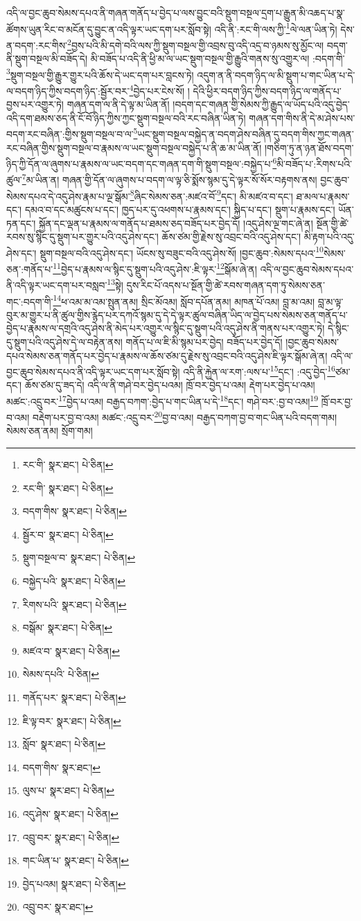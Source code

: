འདི་ལ་བྱང་ཆུབ་སེམས་དཔའ་ནི་གཞན་གནོད་པ་བྱེད་པ་ལས་བྱུང་བའི་སྡུག་བསྔལ་དྲག་པ་རྒྱུན་མི་འཆད་པ་སྣ་ཚོགས་ཡུན་རིང་བ་མངོན་དུ་བྱུང་ན་འདི་ལྟར་ཡང་དག་པར་སློབ་སྟེ། འདི་ནི་:རང་གི་ལས་ཀྱི་\footnote{རང་གི་  སྣར་ཐང་།  པེ་ཅིན། }ལེ་ལན་ཡིན་ཏེ། དེས་ན་བདག་:རང་གིས་\footnote{རང་གི་  སྣར་ཐང་།  པེ་ཅིན། }བྱས་པའི་མི་དགེ་བའི་ལས་ཀྱི་སྡུག་བསྔལ་གྱི་འབྲས་བུ་འདི་འདྲ་བ་ཉམས་སུ་མྱོང་ལ། བདག་ནི་སྡུག་བསྔལ་མི་བཟོད་དེ། མི་བཟོད་པ་འདི་ནི་ཕྱི་མ་ལ་ཡང་སྡུག་བསྔལ་གྱི་རྒྱུའི་གནས་སུ་འགྱུར་ལ། :བདག་གི་\footnote{བདག་གིས་  སྣར་ཐང་།  པེ་ཅིན། }སྡུག་བསྔལ་གྱི་རྒྱུར་གྱུར་པའི་ཆོས་དེ་ཡང་དག་པར་བླངས་ཏེ། འདུག་ན་ནི་བདག་ཉིད་ལ་མི་སྡུག་པ་གང་ཡིན་པ་དེ་ལ་བདག་ཉིད་ཀྱིས་བདག་ཉིད་:སྦྱོར་བར་\footnote{སྦྱོར་བ་  སྣར་ཐང་།  པེ་ཅིན། }བྱེད་པར་ངེས་སོ། །
དེའི་ཕྱིར་བདག་ཉིད་ཀྱིས་བདག་ཉིད་ལ་གནོད་པ་བྱས་པར་འགྱུར་ཏེ། གཞན་དག་ལ་ནི་དེ་ལྟ་མ་ཡིན་ནོ། །བདག་དང་གཞན་གྱི་སེམས་ཀྱི་རྒྱུད་ལ་ཡོད་པའི་འདུ་བྱེད་འདི་དག་ཐམས་ཅད་ནི་ངོ་བོ་ཉིད་ཀྱིས་ཀྱང་སྡུག་བསྔལ་བའི་རང་བཞིན་ཡིན་ཏེ། གཞན་དག་གིས་ནི་དེ་མ་ཤེས་པས་བདག་རང་བཞིན་:གྱིས་སྡུག་བསྔལ་བ་ལ་\footnote{སྡུག་བསྔལ་བ་  སྣར་ཐང་།  པེ་ཅིན། }ཡང་སྡུག་བསྔལ་བསྐྱེད་ན་བདག་ཤེས་བཞིན་དུ་བདག་གིས་ཀྱང་གཞན་རང་བཞིན་གྱིས་སྡུག་བསྔལ་བ་རྣམས་ལ་ཡང་སྡུག་བསྔལ་བསྐྱེད་པ་ནི་ཆ་མ་ཡིན་ནོ། །གཅིག་ཏུ་ན་ཉན་ཐོས་བདག་ཉིད་ཀྱི་དོན་ལ་ཞུགས་པ་རྣམས་ལ་ཡང་བདག་དང་གཞན་དག་གི་སྡུག་བསྔལ་:བསྐྱེད་པ་\footnote{བསྐྱེད་པའི་  སྣར་ཐང་།  པེ་ཅིན། }མི་བཟོད་པ་:རིགས་པའི་ཚུལ་\footnote{རིགས་པའི་  སྣར་ཐང་།  པེ་ཅིན། }མ་ཡིན་ན། གཞན་གྱི་དོན་ལ་ཞུགས་པ་བདག་ལ་ལྟ་ཅི་སྨོས་སྙམ་དུ་དེ་ལྟར་སོ་སོར་བརྟགས་ནས། བྱང་ཆུབ་སེམས་དཔའ་དེ་འདུ་ཤེས་རྣམ་པ་ལྔ་སྒོམ་\footnote{བསྒོམ་  སྣར་ཐང་།  པེ་ཅིན། }ཞིང་སེམས་ཅན་:མཛའ་བོ་\footnote{མཛའ་བ་  སྣར་ཐང་།  པེ་ཅིན། }དང་། མི་མཛའ་བ་དང་། ཐ་མལ་པ་རྣམས་དང་། དམའ་བ་དང་མཚུངས་པ་དང་། ཁྱད་པར་དུ་འཕགས་པ་རྣམས་དང་། སྐྱིད་པ་དང་། སྡུག་པ་རྣམས་དང་། ཡོན་ཏན་དང་། སྐྱོན་དང་ལྡན་པ་རྣམས་ལ་གནོད་པ་ཐམས་ཅད་བཟོད་པར་བྱེད་དོ། །འདུ་ཤེས་ལྔ་གང་ཞེ་ན། སྔོན་གྱི་ཚེ་རབས་སུ་སྙིང་དུ་སྡུག་པར་གྱུར་པའི་འདུ་ཤེས་དང་། ཆོས་ཙམ་གྱི་རྗེས་སུ་འབྲང་བའི་འདུ་ཤེས་དང་། མི་རྟག་པའི་འདུ་ཤེས་དང་། སྡུག་བསྔལ་བའི་འདུ་ཤེས་དང་། ཡོངས་སུ་བཟུང་བའི་འདུ་ཤེས་སོ། །བྱང་ཆུབ་:སེམས་དཔའ་\footnote{སེམས་དཔའི་  པེ་ཅིན། }སེམས་ཅན་:གནོད་པ་\footnote{གནོད་པར་  སྣར་ཐང་།  པེ་ཅིན། }བྱེད་པ་རྣམས་ལ་སྙིང་དུ་སྡུག་པའི་འདུ་ཤེས་:ཇི་ལྟར་\footnote{ཇི་ལྟ་བར་  སྣར་ཐང་།  པེ་ཅིན། }སྒོམ་ཞེ་ན། འདི་ལ་བྱང་ཆུབ་སེམས་དཔའ་ནི་འདི་ལྟར་ཡང་དག་པར་བསླབ་\footnote{སློབ་  སྣར་ཐང་།  པེ་ཅིན། }སྟེ། དུས་རིང་པོ་འདས་པ་སྔོན་གྱི་ཚེ་རབས་གཞན་དག་ཏུ་སེམས་ཅན་གང་:བདག་གི་\footnote{བདག་གིས་  སྣར་ཐང་། }ཕ་འམ་མ་འམ་སྤུན་ནམ། སྲིང་མོའམ། སློབ་དཔོན་ནམ། མཁན་པོ་འམ། བླ་མ་འམ། བླ་མ་ལྟ་བུར་མ་གྱུར་པ་ནི་ཚུལ་གྱིས་རྙེད་པར་དཀའོ་སྙམ་དུ་དེ་དེ་ལྟར་ཚུལ་བཞིན་ཡིད་ལ་བྱེད་པས་སེམས་ཅན་གནོད་པ་བྱེད་པ་རྣམས་ལ་དགྲའི་འདུ་ཤེས་ནི་མེད་པར་འགྱུར་ལ་སྙིང་དུ་སྡུག་པའི་འདུ་ཤེས་ནི་གནས་པར་འགྱུར་ཏེ། དེ་སྙིང་དུ་སྡུག་པའི་འདུ་ཤེས་དེ་ལ་བརྟེན་ནས། གནོད་པ་ལ་ཇི་མི་སྙམ་པར་བྱེད། བཟོད་པར་བྱེད་དོ། །བྱང་ཆུབ་སེམས་དཔའ་སེམས་ཅན་གནོད་པར་བྱེད་པ་རྣམས་ལ་ཆོས་ཙམ་དུ་རྗེས་སུ་འབྲང་བའི་འདུ་ཤེས་ཇི་ལྟར་སྒོམ་ཞེ་ན། འདི་ལ་བྱང་ཆུབ་སེམས་དཔའ་ནི་འདི་ལྟར་ཡང་དག་པར་སློབ་སྟེ། འདི་ནི་རྐྱེན་ལ་རག་:ལས་པ་\footnote{ལུས་པ་  སྣར་ཐང་།  པེ་ཅིན། }དང་། :འདུ་བྱེད་\footnote{འདུ་ཤེས་  སྣར་ཐང་།  པེ་ཅིན། }ཙམ་དང་། ཆོས་ཙམ་དུ་ཟད་དེ། འདི་ལ་ནི་གཤེ་བར་བྱེད་པའམ། ཁྲོ་བར་བྱེད་པ་འམ། རྡེག་པར་བྱེད་པ་འམ། མཚང་:འདྲུ་བར་\footnote{འབྲུ་བར་  སྣར་ཐང་།  པེ་ཅིན། }བྱེད་པ་འམ། བརྒྱད་བཀག་:བྱེད་པ་གང་ཡིན་པ་དེ་\footnote{གང་ཡིན་པ་  སྣར་ཐང་།  པེ་ཅིན། }དང་། གཤེ་བར་:བྱ་བ་འམ།\footnote{བྱེད་པའམ།  སྣར་ཐང་།  པེ་ཅིན། } ཁྲོ་བར་བྱ་བ་འམ། བརྡེག་པར་བྱ་བ་འམ། མཚང་:འདྲུ་བར་\footnote{འབྲུ་བར་  སྣར་ཐང་། }བྱ་བ་འམ། བརྒྱད་བཀག་བྱ་བ་གང་ཡིན་པའི་བདག་གམ། སེམས་ཅན་ནམ། སྲོག་གམ། 